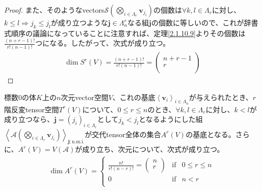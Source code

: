 \documentclass[dvipdfmx]{jsarticle}
\begin{document}
\begin{proof}
また、そのようなvectors$\mathcal{S}\left( \bigotimes_{i \in \varLambda_{r}} \mathbf{v}_{j_{i}} \right)$の個数は$\forall k,l \in \varLambda_{r}$に対し、$k \leq l \Rightarrow j_{k} \leq j_{l}$が成り立つような$\mathbf{j} \in \varLambda_{n}^{r}$なる組$\mathbf{j}$の個数に等しいので、これが辞書式順序の議論になっていることに注意すれば、定理\ref{2.1.10.9}よりその個数は$\frac{(n + r - 1)!}{r!(n - 1)!}$つになる。したがって、次式が成り立つ。
\begin{align*}
\dim{S^{r}(V)} = \frac{(n + r - 1)!}{r!(n - 1)!} = \begin{pmatrix}
n + r - 1 \\
r \\
\end{pmatrix}
\end{align*}
\end{proof}
\begin{thm}\label{2.4.8.15}
標数$0$の体$K$上の$n$次元vector空間$V$、これの基底$\left\langle \mathbf{v}_{i} \right\rangle_{i \in \varLambda_{n}}$が与えられたとき、$r$階反変tensor空間$T^{r}(V)$について、$0 \leq r \leq n$のとき、$\forall k,l \in \varLambda_{r}$に対し、$k < l$が成り立つなら、$\mathbf{j}=\left( j_{i} \right)_{i \in \varLambda_{r}}$として$j_{k} < j_{l}$となるようにした組$\left\langle \mathcal{A}\left( \bigotimes_{i \in \varLambda_{r}} \mathbf{v}_{j_{i}} \right) \right\rangle_{\mathbf{j}:\mathrm{n.m.i.} }$が交代tensor全体の集合$A^{r}(V)$の基底となる。さらに、$A^{r}(V) = V\left( \mathcal{A} \right)$が成り立ち、次元について、次式が成り立つ。
\begin{align*}
\dim{A^{r}(V)} = \left\{ \begin{matrix}
\frac{n!}{r!(n - r)!} = \begin{pmatrix}
n \\
r \\
\end{pmatrix} & \mathrm{if} & 0 \leq r \leq n \\
0 & \mathrm{if} & n < r \\
\end{matrix} \right.\ 
\end{align*}
\end{thm}
\end{document}
